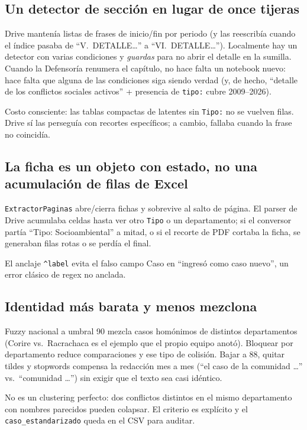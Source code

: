 \documentclass[11pt,a4paper]{article}
\begin{document}
\subsection{Un detector de sección en lugar de once tijeras}

Drive mantenía listas de frases de inicio/fin por periodo (y las reescribía cuando el índice pasaba de ``V.\ DETALLE\ldots'' a ``VI.\ DETALLE\ldots''). Localmente hay un detector con varias condiciones y \emph{guardas} para no abrir el detalle en la sumilla. Cuando la Defensoría renumera el capítulo, no hace falta un notebook nuevo: hace falta que alguna de las condiciones siga siendo verdad (y, de hecho, ``detalle de los conflictos sociales activos'' + presencia de \texttt{tipo:} cubre 2009--2026).

Costo consciente: las tablas compactas de latentes sin \texttt{Tipo:} no se vuelven filas. Drive sí las perseguía con recortes específicos; a cambio, fallaba cuando la frase no coincidía.

\subsection{La ficha es un objeto con estado, no una acumulación de filas de Excel}

\texttt{ExtractorPaginas} abre/cierra fichas y sobrevive al salto de página. El parser de Drive acumulaba celdas hasta ver otro \texttt{Tipo} o un departamento; si el conversor partía ``Tipo: Socioambiental'' a mitad, o si el recorte de PDF cortaba la ficha, se generaban filas rotas o se perdía el final.

El anclaje \texttt{\^{}label} evita el falso campo Caso en ``ingresó como caso nuevo'', un error clásico de regex no anclada.

\subsection{Identidad más barata y menos mezclona}

Fuzzy nacional a umbral 90 mezcla casos homónimos de distintos departamentos (Corire vs.\ Racrachaca es el ejemplo que el propio equipo anotó). Bloquear por departamento reduce comparaciones y ese tipo de colisión. Bajar a 88, quitar tildes y stopwords compensa la redacción mes a mes (``el caso de la comunidad \ldots'' vs.\ ``comunidad \ldots'') sin exigir que el texto sea casi idéntico.

No es un clustering perfecto: dos conflictos distintos en el mismo departamento con nombres parecidos pueden colapsar. El criterio es explícito y el \texttt{caso\_estandarizado} queda en el CSV para auditar.
\end{document}

